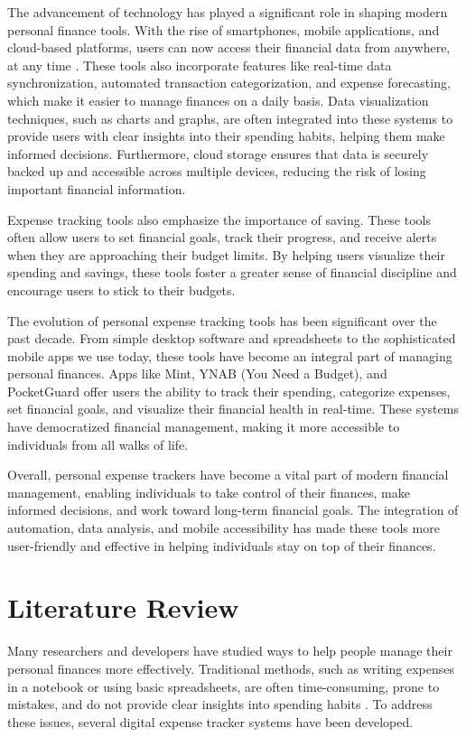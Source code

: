 \documentclass[12pt]{report}
\begin{document}
The advancement of technology has played a significant role in shaping modern personal finance tools. With the rise of smartphones, mobile applications, and cloud-based platforms, users can now access their financial data from anywhere, at any time \citep{verma2024research}. These tools also incorporate features like real-time data synchronization, automated transaction categorization, and expense forecasting, which make it easier to manage finances on a daily basis. Data visualization techniques, such as charts and graphs, are often integrated into these systems to provide users with clear insights into their spending habits, helping them make informed decisions. Furthermore, cloud storage ensures that data is securely backed up and accessible across multiple devices, reducing the risk of losing important financial information.

Expense tracking tools also emphasize the importance of saving. These tools often allow users to set financial goals, track their progress, and receive alerts when they are approaching their budget limits. By helping users visualize their spending and savings, these tools foster a greater sense of financial discipline and encourage users to stick to their budgets.

The evolution of personal expense tracking tools has been significant over the past decade. From simple desktop software and spreadsheets to the sophisticated mobile apps we use today, these tools have become an integral part of managing personal finances. Apps like Mint, YNAB (You Need a Budget), and PocketGuard offer users the ability to track their spending, categorize expenses, set financial goals, and visualize their financial health in real-time. These systems have democratized financial management, making it more accessible to individuals from all walks of life.

Overall, personal expense trackers have become a vital part of modern financial management, enabling individuals to take control of their finances, make informed decisions, and work toward long-term financial goals. The integration of automation, data analysis, and mobile accessibility has made these tools more user-friendly and effective in helping individuals stay on top of their finances.

\section{Literature Review}
Many researchers and developers have studied ways to help people manage their personal finances more effectively. Traditional methods, such as writing expenses in a notebook or using basic spreadsheets, are often time-consuming, prone to mistakes, and do not provide clear insights into spending habits \cite{manchanda2012expense}. To address these issues, several digital expense tracker systems have been developed.
\end{document}

